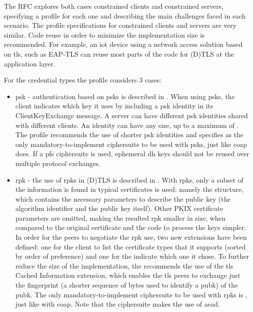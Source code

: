 \documentclass{llncs}
\begin{document}
The RFC explores both cases constrained clients and constrained servers, specifying
a profile for each one and describing the main challenges faced in each scenario.
The profile specifications for constrained clients and servers are very similar.
Code reuse in order to minimize the implementation size is recommended. For example, an \gls{iot} device
using a network access solution based on \gls{tls}, such as EAP-TLS\cite{rfc5216}
can reuse most parts of the code for (D)TLS at the application layer.

For the credential types the profile considers 3 cases:

\begin{itemize}
  \item \gls{psk} - authentication based on \gls{psk}s is described in
  \cite{rfc4279}. When using \gls{psk}s, the client indicates which
  key it uses by including a \gls{psk} identity in its ClientKeyExchange message.
  A server can have different \gls{psk} identities shared with different clients.
  An identity can have any size, up to a maximum of .
  The profile recommends the use of shorter \gls{psk} identities and specifies
   as the only mandatory-to-implement
  ciphersuite to be used with \gls{psk}s, just like \gls{coap} does. If a \gls{pfs}
  ciphersuite is used, ephemeral \gls{dh} keys should not be reused over multiple protocol exchanges.

  \item \gls{rpk} - the use of \gls{rpk}s in (D)TLS is described in \cite{rfc7250}.
  With \gls{rpk}s, only a subset of the information is found in typical certificates
  is used: namely the  structure, which contains
  the necessary parameters to describe the public key (the algorithm identifier
  and the public key itself). Other PKIX certificate\cite{RFC5280} parameters are
  omitted, making the resulted \gls{rpk} smaller in size, when compared to the
  original certificate and the code to process the keys simpler. In order for the
  peers to negotiate the \gls{rpk} use, two new extensions have been defined:
  one for the client to list the certificate types that it supports (sorted by order of preference) and one for
  the indicate which one it chose. To further reduce the size of the implementation, the 
  recommends the use of the \gls{tls} Cached Information extension\cite{RFC7924}, which
  enables the \gls{tls} peers to exchange just the fingerprint (a shorter sequence of bytes
  used to identify a \gls{pubk}) of the \gls{pubk}. The only mandatory-to-implement
  ciphersuite to be used with \gls{rpk}s is ,
  just like with \gls{coap}. Note that the ciphersuite makes the use of \gls{aead}.


\end{itemize}
\end{document}

